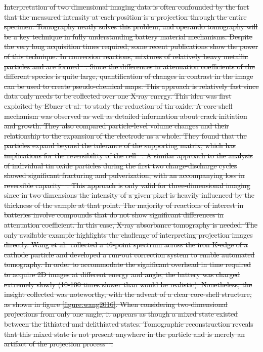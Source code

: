 \documentclass[journal=cmatex,manuscript=perspective]{achemso}
\providecommand{\DIFdeltex}[1]{{\protect\color{red}\sout{#1}}}                      %
\providecommand{\DIFdelbegin}{} %
\providecommand{\DIFdel}[1]{\texorpdfstring{\DIFdeltex{#1}}{}} %
\begin{document}
\DIFdelbegin \DIFdel{Interpretation of two dimensional imaging data is often confounded by
the fact that the measured intensity at each position is a projection
through the entire specimen. Tomography neatly solves this problem,
and operando tomography will be a key technique in fully understanding
battery material mechanisms. Despite the very long acquisition times
required, some recent publications show the power of this
technique. In conversion reactions, mixtures of relatively heavy
metallic particles and \ce{Li2O} are formed\mbox{%
\cite{cabana2010-2}}%
. Since
the differences in attenuation coefficients of the different species
is quite large, quantification of changes in contrast in the image can
be used to create pseudo-chemical maps. This approach is relatively
fast since data only needs to be collected over one X-ray energy. This
idea was first exploited by Ebner et al.\ to study the reduction of
tin oxide. A core-shell mechanism was observed as well as detailed
information about crack initiation and growth. They also compared
particle-level volume changes and their relationship to the expansion
of the electrode as a whole. They found that the particles expand
beyond the tolerance of the supporting matrix, which has implications
for the reversibility of the cell\mbox{%
\cite{ebner2013}}%
. A similar approach
to the analysis of individual tin oxide particles during the first two
charge-discharge cycles showed significant fracturing and
pulverization, with an accompanying loss in reversible
capacity\mbox{%
\cite{wang2014-2}}%
. This approach is only valid for
three-dimensional imaging since in two-dimensions the intensity of a
given pixel is heavily influenced by the thickness of the sample at
that point. The majority of reactions of interest in batteries involve
compounds that do not show significant differences in attenuation
coefficient. In this case, X-ray absorbance tomography is needed. The
only available example highlights the challenge of interpreting
projection images directly. Wang et al.\ collected a 46-point spectrum
across the iron K-edge of a \ce{LiFePO4} cathode particle and
developed a run-out correction system to enable automated
tomography. In order to accommodate the significant overhead in time
required to acquire 2D images at different energy and angle, the
battery was charged extremely slowly (10-100 times slower than would
be realistic). Nonetheless, the insight collected was noteworthy, with
the advent of a clear core-shell structure, as shown in figure
\ref{figure:wang2016}. When considering two-dimensional projections
from only one angle, it appears as though a mixed state existed
between the lithiated and delithiated states. Tomographic
reconstruction reveals that this mixed state is not present anywhere
in the particle and is merely an artifact of the projection
process\mbox{%
\cite{wang2016}}%
.
}%
\end{document}
